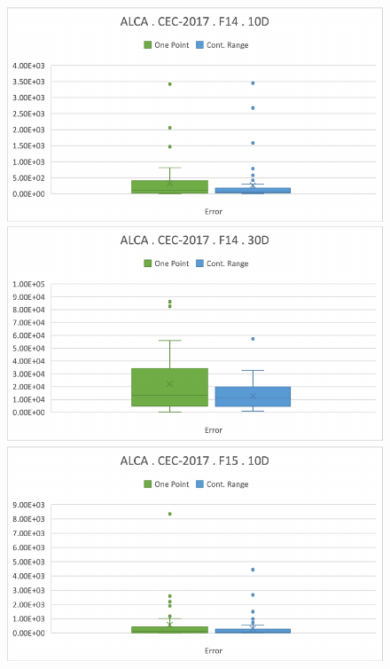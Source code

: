 \documentclass[graybox]{svmult}
\begin{document}
\begin{figure}[!ht]
\begin{minipage}[h]{0.49\linewidth}
        \end{minipage}
        \vfill
        \vspace{0.05 cm}
        \begin{minipage}[h]{0.49\linewidth}
            \includegraphics[width=1\linewidth]{img/fig_experiment_F14x10D.pdf} 
        \end{minipage}
        \hfill
        \begin{minipage}[h]{0.49\linewidth}
            \includegraphics[width=1\linewidth]{img/fig_experiment_F14x30D.pdf} 
        \end{minipage}
        \vfill
        \vspace{0.05 cm}
        \begin{minipage}[h]{0.49\linewidth}
            \includegraphics[width=1\linewidth]{img/fig_experiment_F15x10D.pdf} 

\end{minipage}
\end{figure}
\end{document}
